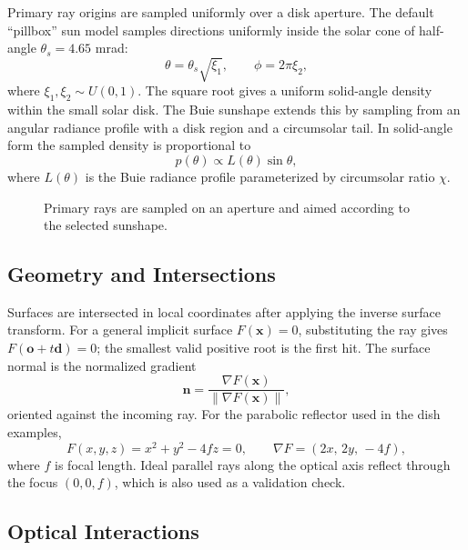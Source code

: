 Primary ray origins are sampled uniformly over a disk aperture.  The default ``pillbox'' sun
model samples directions uniformly inside the solar cone of half-angle
$\theta_s = 4.65$ mrad:
\begin{equation}
  \theta = \theta_s \sqrt{\xi_1}, \qquad
  \phi = 2\pi \xi_2 ,
\end{equation}
where $\xi_1,\xi_2 \sim U(0,1)$.  The square root gives a uniform solid-angle density within
the small solar disk.  The Buie sunshape extends this by sampling from an angular radiance
profile with a disk region and a circumsolar tail.  In solid-angle form the sampled density is
proportional to
\begin{equation}
  p(\theta) \propto L(\theta)\sin\theta ,
\end{equation}
where $L(\theta)$ is the Buie radiance profile parameterized by circumsolar ratio $\chi$.

\begin{figure}[h]
  \centering
  \caption{Primary rays are sampled on an aperture and aimed according to the selected sunshape.}
\end{figure}

\subsection{Geometry and Intersections}

Surfaces are intersected in local coordinates after applying the inverse surface transform.
For a general implicit surface $F(\mathbf{x})=0$, substituting the ray gives
$F(\mathbf{o}+t\mathbf{d})=0$; the smallest valid positive root is the first hit.  The
surface normal is the normalized gradient
\begin{equation}
  \mathbf{n} = \frac{\nabla F(\mathbf{x})}{\|\nabla F(\mathbf{x})\|},
\end{equation}
oriented against the incoming ray.  For the parabolic reflector used in the dish examples,
\begin{equation}
  F(x,y,z) = x^2+y^2-4fz = 0 ,
  \qquad
  \nabla F = (2x,\,2y,\,-4f),
\end{equation}
where $f$ is focal length.  Ideal parallel rays along the optical axis reflect through the
focus $(0,0,f)$, which is also used as a validation check.

\subsection{Optical Interactions}


